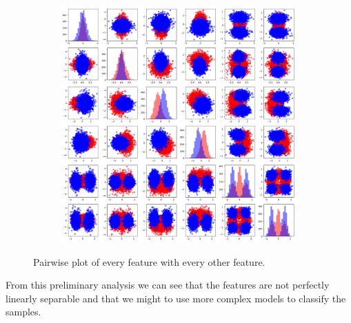 \documentclass[12pt]{report}
\begin{document}
\begin{figure}[H]
    \centering
    \begin{subfigure}[t]{1\textwidth}
        \includegraphics[width=\textwidth]{./plot/features/features_all.png}
    \end{subfigure}
    \caption{Pairwise plot of every feature with every other feature.}
    \label{fig:pairwise_plot_all}
\end{figure}
\noindent
From this preliminary analysis we can see that the features are not perfectly linearly separable and that we might to use more complex models to classify the samples.
\end{document}
